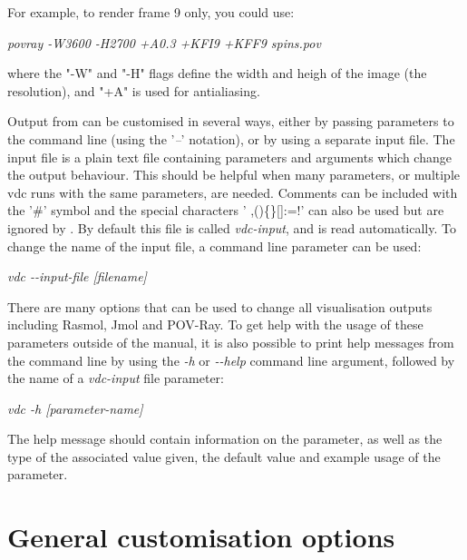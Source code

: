 For example, to render frame 9 only, you could use:

\noindent
\begin{minipage}[c]{\textwidth}
\centering
\textit{povray -W3600 -H2700 +A0.3 +KFI9 +KFF9 spins.pov}
\end{minipage}

\noindent where the "-W" and "-H" flags define the width and heigh of the image (the resolution), and "+A" is used for antialiasing.

Output from \vdc can be customised in several ways, either by passing parameters to the command line (using the '\textit{--}' notation), or by using a separate \vdc input file. The \vdc input file is a plain text file containing parameters and arguments which change the output behaviour. This should be helpful when many parameters, or multiple vdc runs with the same parameters, are needed. Comments can be included with the '\#' symbol and the special characters ' ,()\{\}[]:=!' can also be used but are ignored by \vdc.  By default this file is called \textit{vdc-input}, and is read automatically. To change the name of the \vdc input file, a command line parameter can be used:

\noindent
\begin{minipage}[c]{\textwidth}
\centering
\textit{vdc -{}-input-file [filename]}
\end{minipage}

There are many options that can be used to change all visualisation outputs including Rasmol, Jmol and POV-Ray. To get help with the usage of these parameters outside of the manual, it is also possible to print help messages from the command line by using the \textit{-h} or \textit{-{}-help} command line argument, followed by the name of a \textit{vdc-input} file parameter:

\noindent
\begin{minipage}[c]{\textwidth}
\centering
\textit{vdc -h [parameter-name]}
\end{minipage}

The help message should contain information on the parameter, as well as the type of the associated value given, the default value and example usage of the parameter.

\section*{General customisation options}

